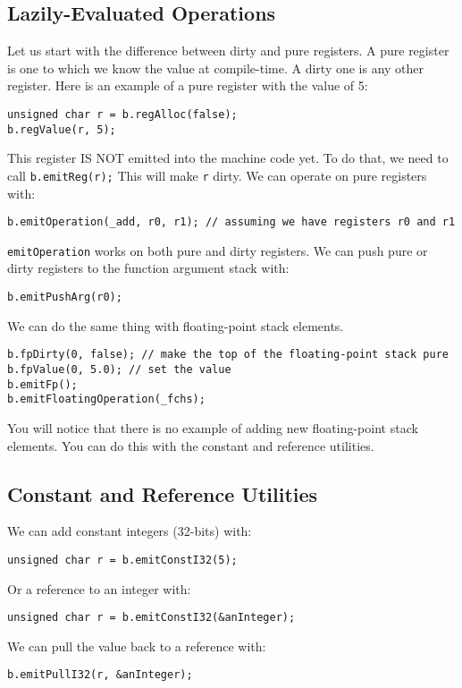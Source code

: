 \documentclass[10pt,a4paper]{article}
\begin{document}
\subsection{Lazily-Evaluated Operations}
Let us start with the difference between dirty and pure registers. A pure register is one to which we know the value at compile-time. A dirty one is any other register. Here is an example of a pure register with the value of 5:
\begin{verbatim}
unsigned char r = b.regAlloc(false);
b.regValue(r, 5);
\end{verbatim}

This register IS NOT emitted into the machine code yet. To do that, we need to call \verb|b.emitReg(r);| This will make \verb|r| dirty. We can operate on pure registers with:
\begin{verbatim}
b.emitOperation(_add, r0, r1); // assuming we have registers r0 and r1
\end{verbatim}

\verb|emitOperation| works on both pure and dirty registers. We can push pure or dirty registers to the function argument stack with:
\begin{verbatim}
b.emitPushArg(r0);
\end{verbatim}

We can do the same thing with floating-point stack elements.
\begin{verbatim}
b.fpDirty(0, false); // make the top of the floating-point stack pure
b.fpValue(0, 5.0); // set the value
b.emitFp();
b.emitFloatingOperation(_fchs);
\end{verbatim}

You will notice that there is no example of adding new floating-point stack elements. You can do this with the constant and reference utilities.

\subsection{Constant and Reference Utilities}
We can add constant integers (32-bits) with:
\begin{verbatim}
unsigned char r = b.emitConstI32(5);
\end{verbatim}

Or a reference to an integer with:
\begin{verbatim}
unsigned char r = b.emitConstI32(&anInteger);
\end{verbatim}

We can pull the value back to a reference with:
\begin{verbatim}
b.emitPullI32(r, &anInteger);
\end{verbatim}
\end{document}
